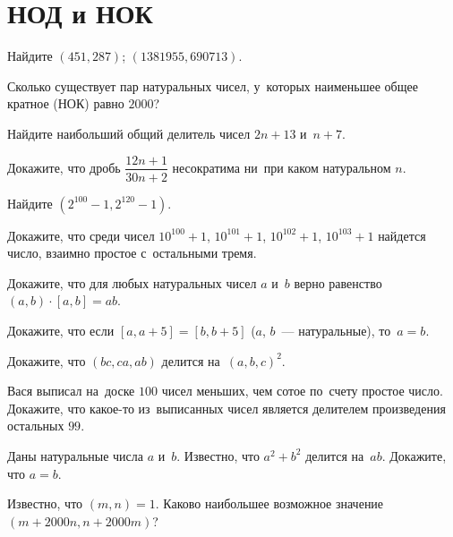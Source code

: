 
\section*{НОД и НОК}


\begin{problems}

\item
Найдите $(451, 287)$; $(1381955, 690713)$.

\item
Сколько существует пар натуральных чисел, у~которых наименьшее общее кратное
(НОК) равно $2000$?

\item
Найдите наибольший общий делитель чисел $2 n + 13$ и~$n + 7$.

\item
Докажите, что дробь\enspace
$\dfrac{12 n + 1}{30 n + 2}$\enspace
несократима ни~при каком натуральном $n$.

\item
Найдите $(2^{100} - 1, 2^{120} - 1)$.

\item
Докажите, что среди чисел
$10^{100} + 1$, $10^{101} + 1$, $10^{102} + 1$, $10^{103} + 1$ найдется число,
взаимно простое с~остальными тремя.

\item
Докажите, что для любых натуральных чисел $a$ и~$b$ верно равенство
$(a, b) \cdot [a, b] = a b$.

\item
Докажите, что если $[a, a + 5] = [b, b + 5]$ ($a$, $b$~--- натуральные),
то~$a = b$.

\item
Докажите, что $(b c, c a, a b)$ делится на~$(a, b, c)^2$.

\item
Вася выписал на~доске $100$ чисел меньших, чем сотое по~счету простое число.
Докажите, что какое-то из~выписанных чисел является делителем произведения
остальных $99$.

\item
Даны натуральные числа $a$ и~$b$.
Известно, что $a^2 + b^2$ делится на~$ab$.
Докажите, что $a = b$.

\item
Известно, что $(m, n) = 1$.
Каково наибольшее возможное значение $(m + 2000 n, n + 2000 m)$?

\end{problems}

